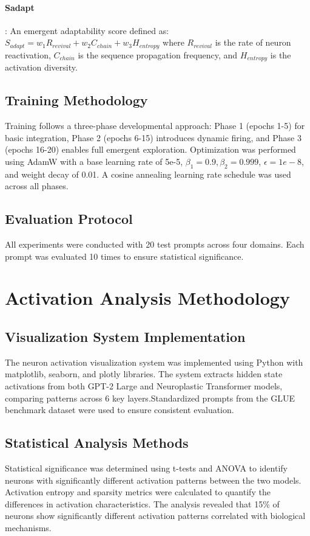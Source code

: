 \documentclass[11pt, letterpaper]{article}
\begin{document}
\paragraph{Sadapt}: An emergent adaptability score defined as:
$S_{adapt} = w_1 R_{revival} + w_2 C_{chain} + w_3 H_{entropy}$
where $R_{revival}$ is the rate of neuron reactivation, $C_{chain}$ is the sequence propagation frequency, and $H_{entropy}$ is the activation diversity.

\subsection{Training Methodology}
Training follows a three-phase developmental approach: Phase 1 (epochs 1-5) for basic integration, Phase 2 (epochs 6-15) introduces dynamic firing, and Phase 3 (epochs 16-20) enables full emergent exploration.
Optimization was performed using AdamW with a base learning rate of 5e-5, 
$\beta_1=0.9, \beta_2=0.999$, $\epsilon=1e-8$, and weight decay of 0.01.
A cosine annealing learning rate schedule was used across all phases.

\subsection{Evaluation Protocol}
All experiments were conducted with 20 test prompts across four domains.
Each prompt was evaluated 10 times to ensure statistical significance.

\section{Activation Analysis Methodology}
\subsection{Visualization System Implementation}
The neuron activation visualization system was implemented using Python with 
matplotlib, seaborn, and plotly libraries. The system extracts hidden state activations from both GPT-2 Large and Neuroplastic Transformer models, comparing patterns across 6 key layers.Standardized prompts from the GLUE benchmark dataset were used to ensure consistent evaluation.

\subsection{Statistical Analysis Methods}
Statistical significance was determined using t-tests and ANOVA to identify 
neurons with significantly different activation patterns between the two models. Activation entropy and sparsity metrics were calculated to quantify the differences in activation characteristics. The analysis revealed that 15\% of neurons show significantly different activation patterns correlated with biological mechanisms.
\end{document}

